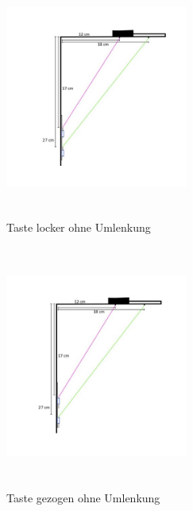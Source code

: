 \begin{figure}[htbp]
    \centering
    \includegraphics[width=6cm, height=8cm]{img/Umlenkung_locker}
    \caption{Taste locker ohne Umlenkung}
    \label{img:Umlenkung_locker}
\end{figure}

\begin{figure}[htbp]
    \centering
    \includegraphics[width=6cm, height=8cm]{img/Umlenkung_gezogen}
    \caption{Taste gezogen ohne Umlenkung}
    \label{img:Umlenkung_gezogen}
\end{figure}

\newpage

